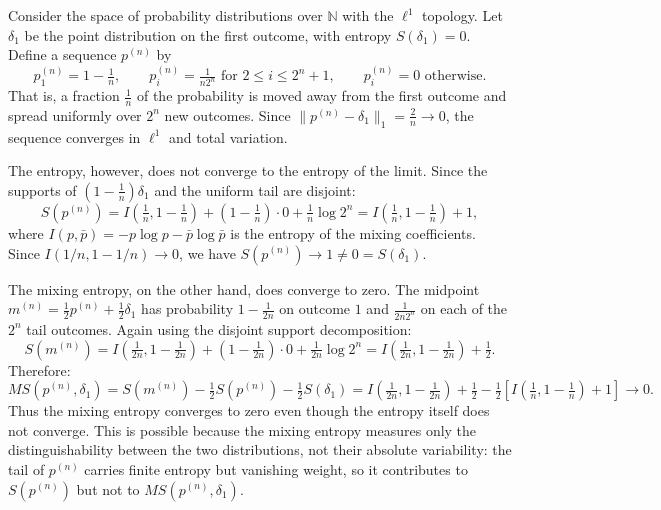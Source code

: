 \begin{example}
	Consider the space of probability distributions over $\mathbb{N}$ with the $\ell^1$ topology. Let $\delta_1$ be the point distribution on the first outcome, with entropy $S(\delta_1) = 0$. Define a sequence $p^{(n)}$ by
	\[
	p^{(n)}_1 = 1 - \tfrac{1}{n}, \qquad
	p^{(n)}_i = \tfrac{1}{n 2^n} \text{ for } 2 \leq i \leq 2^n + 1, \qquad
	p^{(n)}_i = 0 \text{ otherwise}.
	\]
	That is, a fraction $\frac{1}{n}$ of the probability is moved away from the first outcome and spread uniformly over $2^n$ new outcomes. Since $\|p^{(n)} - \delta_1\|_1 = \frac{2}{n} \to 0$, the sequence converges in $\ell^1$ and total variation.
	
	The entropy, however, does not converge to the entropy of the limit. Since the supports of $(1-\frac{1}{n})\delta_1$ and the uniform tail are disjoint:
	\[
	S(p^{(n)}) = I\!\left(\tfrac{1}{n}, 1 - \tfrac{1}{n}\right) + \left(1 - \tfrac{1}{n}\right) \cdot 0 + \tfrac{1}{n} \log 2^n
	= I\!\left(\tfrac{1}{n}, 1 - \tfrac{1}{n}\right) + 1,
	\]
	where $I(p, \bar{p}) = -p \log p - \bar{p}\log\bar{p}$ is the entropy of the mixing coefficients. Since $I(1/n, 1-1/n) \to 0$, we have $S(p^{(n)}) \to 1 \neq 0 = S(\delta_1)$.
	
	The mixing entropy, on the other hand, does converge to zero. The midpoint $m^{(n)} = \frac{1}{2}p^{(n)} + \frac{1}{2}\delta_1$ has probability $1 - \frac{1}{2n}$ on outcome $1$ and $\frac{1}{2n2^n}$ on each of the $2^n$ tail outcomes. Again using the disjoint support decomposition:
	\[
	S(m^{(n)}) = I\!\left(\tfrac{1}{2n}, 1 - \tfrac{1}{2n}\right) + \left(1 - \tfrac{1}{2n}\right) \cdot 0 + \tfrac{1}{2n} \log 2^n
	= I\!\left(\tfrac{1}{2n}, 1 - \tfrac{1}{2n}\right) + \tfrac{1}{2}.
	\]
	Therefore:
	\[
	MS(p^{(n)}, \delta_1) = S(m^{(n)}) - \tfrac{1}{2}S(p^{(n)}) - \tfrac{1}{2}S(\delta_1)
	= I\!\left(\tfrac{1}{2n}, 1 - \tfrac{1}{2n}\right) + \tfrac{1}{2} - \tfrac{1}{2}\left[I\!\left(\tfrac{1}{n}, 1 - \tfrac{1}{n}\right) + 1\right] \to 0.
	\]
	Thus the mixing entropy converges to zero even though the entropy itself does not converge. This is possible because the mixing entropy measures only the distinguishability between the two distributions, not their absolute variability: the tail of $p^{(n)}$ carries finite entropy but vanishing weight, so it contributes to $S(p^{(n)})$ but not to $MS(p^{(n)}, \delta_1)$.
	
	\begin{figure}[H]
	\centering
\end{figure}
\end{example}
